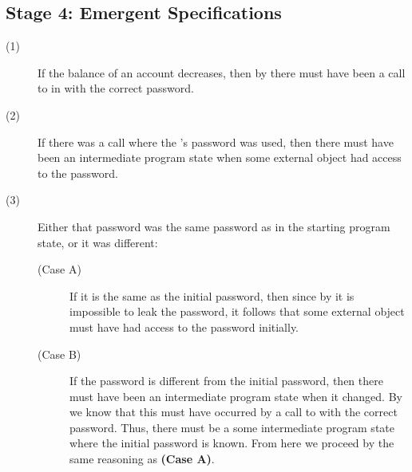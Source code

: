 \subsection{Stage 4: Emergent \Nec Specifications}
\begin{description}
\item [(1)]
If the balance of an account decreases, then
by  there must have been a call
to  in  with the correct password.
\item [(2)]
If there was a call where the 's password 
was used, then there must have been an intermediate program state
when some external object had access to the password.
\item [(3)]
Either that password was the same password as in the starting 
program state, or it was different:
\begin{description}
\item [(Case A)]
If it is the same as the initial password, then since by 
it is impossible to leak the password, it follows that some external object 
must have had access to the password initially.
\item [(Case B)]
If the password is different from the initial password, 
then there must have been an intermediate program state when it 
changed. By  we know that this must have occurred
by a call to  with the correct password. Thus,
there must be a some intermediate program state where the initial
password is known. From here we proceed by the same reasoning 
as \textbf{(Case A)}.
\end{description}
\end{description}
